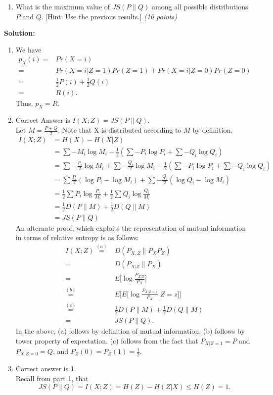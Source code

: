 \documentclass[12pt]{article}
\begin{document}
\begin{enumerate}
\begin{enumerate}
\item What is the maximum value of $JS(P\|Q)$ among all possible distributions $P$ and $Q$. [Hint: Use the previous results.] {\it (10 points)}
\end{enumerate}


\vskip 0.2in
\begin{solution}
{\bf Solution:}\\

\begin{enumerate}
\item We have
\begin{align*}
    p_X(i) =& Pr(X=i)\\ 
    =& Pr(X=i|Z=1)Pr(Z=1) + Pr(X=i|Z=0)Pr(Z=0)\\
    =& \frac{1}{2}P(i) + \frac{1}{2}Q(i)\\
    =& R(i).
\end{align*}
Thus, $p_X = R$.
\item Correct Answer is $I(X;Z) = JS(P\|Q)$.\\Let $M = \frac{P+Q}{2}$. Note that X is distributed according to $M$ by definition. 
\begin{align}
I(X;Z) &= H(X)-H(X|Z)\\
&=\sum -M_i \log M_i - \frac{1}{2}\left(\sum -P_i\log P_i + \sum -Q_i\log Q_i\right)\\
&=\sum -\frac{P_i}{2} \log M_i + \sum -\frac{Q_i}{2} \log M_i - \frac{1}{2}\left(\sum -P_i\log P_i + \sum -Q_i\log Q_i\right)\\
&=\sum \frac{P_i}{2} (\log P_i - \log M_i) + \sum -\frac{Q_i}{2} (\log Q_i - \log M_i)\\
&=\frac{1}{2}\sum P_i\log \frac{P_i}{M_i} + \frac{1}{2}\sum Q_i\log\frac{Q_i}{M_i}\\
&=\frac{1}{2}D(P\|M)+\frac{1}{2}D(Q\|M)\\
&=JS(P\|Q)
\end{align}
An alternate proof, which exploits the representation of mutual information in terms of relative entropy is as follows:
\begin{align*}
I(X;Z) \stackrel{(a)}{=}& D(P_{X,Z} \| P_{X}P_{Z}) \\
=& D(P_{X|Z} \| P_{X}) \\
=& E \big[\log \frac{P_{X|Z}}{P_X}\big] \\
\stackrel{(b)}{=}& E \bigg[ E \big[\log \frac{P_{X|Z=z}}{P_X} | Z=z\big] \bigg]  \\
\stackrel{(c)}{=}& \frac{1}{2} D(P \| M) + \frac{1}{2} D(Q \| M) \\
=& JS(P\|Q). 
\end{align*}
In the above, (a) follows by definition of mutual information. (b) follows by tower property of expectation. (c) follows from the fact that $P_{X|Z=1} = P$ and $P_{X|Z=0} = Q$, and $P_{Z}(0) = P_{Z}(1) = \frac{1}{2}$. 
\item Correct answer is 1.\\Recall from part 1, that 
\[
JS(P\|Q) = I(X;Z) = H(Z)-H(Z|X) \leq H(Z) = 1.
\]
\end{enumerate}


\end{solution}
\end{enumerate}
\end{document}
